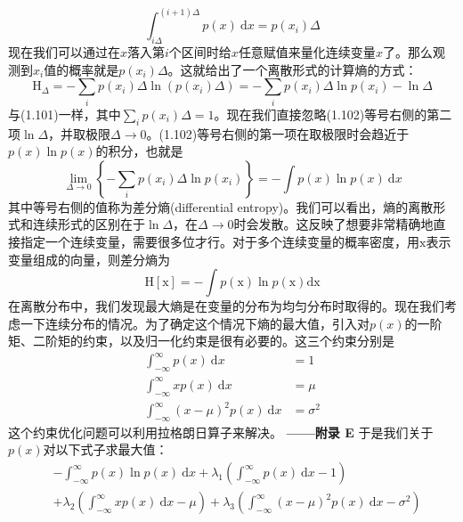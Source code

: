 \documentclass[b5paper]{book}
\numberwithin{equation}{chapter}
\begin{document}
{	\begin{equation}
		\int_{i\Delta}^{(i+1)\Delta} p(x)\ \mathrm{d}x = p(x_i) \Delta
	\end{equation}
	现在我们可以通过在$x$落入第$i$个区间时给$x$任意赋值来量化连续变量$x$了。那么观测到$x_i$值的概率就是$p(x_i)\Delta$。这就给出了一个离散形式的计算熵的方式：
	\begin{equation}
		\mathrm{H}_{\Delta}=-\sum_{i}p(x_i)\Delta \ln(p(x_i)\Delta) = -\sum_i p(x_i)\Delta \ln p(x_i)-\ln \Delta
	\end{equation}
	与(1.101)一样，其中$\sum_i p(x_i) \Delta =1$。现在我们直接忽略(1.102)等号右侧的第二项$\ln \Delta$，并取极限$\Delta \rightarrow 0$。(1.102)等号右侧的第一项在取极限时会趋近于$p(x)\ln p(x)$的积分，也就是
	\begin{equation}
		\lim_{\Delta \rightarrow 0} \left\{ - \sum_i p(x_i)\Delta \ln p(x_i) \right\} = -\int p(x)\ln p(x)\ \mathrm{d}x
	\end{equation}
	其中等号右侧的值称为差分熵(differential entropy)。我们可以看出，熵的离散形式和连续形式的区别在于$\ln \Delta$，在$\Delta \rightarrow 0$时会发散。这反映了想要非常精确地直接指定一个连续变量，需要很多位才行。对于多个连续变量的概率密度，用$\boldsymbol{\mathrm{x}}$表示变量组成的向量，则差分熵为
	\begin{equation}
		\mathrm{H}[\boldsymbol{\mathrm{x}}] = -\int p(\boldsymbol{\mathrm{x}}) \ln p(\boldsymbol{\mathrm{x}}) \mathrm{d}\boldsymbol{\mathrm{x}}
	\end{equation}
	\indent 在离散分布中，我们发现最大熵是在变量的分布为均匀分布时取得的。现在我们考虑一下连续分布的情况。为了确定这个情况下熵的最大值，引入对$p(x)$的一阶矩、二阶矩的约束，以及归一化约束是很有必要的。这三个约束分别是
	\begin{align}
		\int_{-\infty}^{\infty} p(x)\ \mathrm{d}x &= 1 \\
		\int_{-\infty}^{\infty} xp(x)\ \mathrm{d}x &= \mu \\
		\int_{-\infty}^{\infty} (x-\mu)^2p(x)\ \mathrm{d}x &= \sigma^2
	\end{align}
	这个约束优化问题可以利用拉格朗日算子来解决。\color{red} \textbf{——附录 E} \color{black}于是我们关于$p(x)$对以下式子求最大值：
	\begin{equation*}
	\begin{split}
		&-\int_{-\infty}^{\infty} p(x)\ln p(x)\ \mathrm{d}x + \lambda_1 \left(\int_{-\infty}^{\infty} p(x)\ \mathrm{d}x -1\right)\\
		&+ \lambda_2 \left(\int_{-\infty}^{\infty} xp(x)\ \mathrm{d}x -\mu \right) +\lambda_3\left(\int_{-\infty}^{\infty} (x-\mu)^2p(x)\ \mathrm{d}x - \sigma^2\right)

\end{split}
\end{equation*}}
\end{document}
